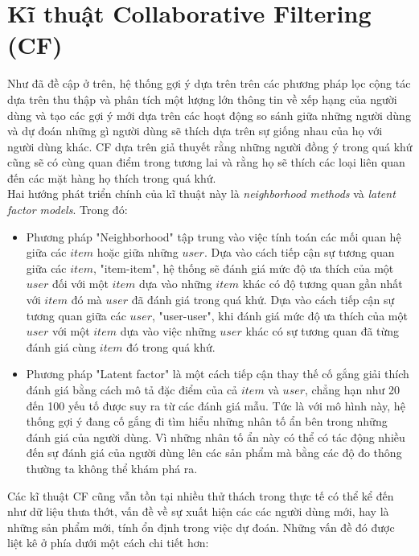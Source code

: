 \section{Kĩ thuật Collaborative Filtering (CF)}
Như đã đề cập ở trên, hệ thống gợi ý dựa trên trên các phương pháp lọc cộng tác dựa trên thu thập và phân tích một lượng lớn thông tin về xếp hạng của người dùng và tạo các gợi ý mới dựa trên các hoạt động so sánh giữa những người dùng và dự đoán những gì người dùng sẽ thích dựa trên sự giống nhau của họ với người dùng khác. CF dựa trên giả thuyết rằng những người đồng ý trong quá khứ cũng sẽ có cùng quan điểm trong tương lai và rằng họ sẽ thích các loại liên quan đến các mặt hàng họ thích trong quá khứ.\\
Hai hướng phát triển chính của kĩ thuật này là \textit{neighborhood methods} và \textit{latent factor models}. Trong đó:
\begin{itemize}
    \item Phương pháp "Neighborhood" tập trung vào việc tính toán các mối quan hệ giữa các $item$ hoặc giữa những $user$. Dựa vào cách tiếp cận sự tương quan giữa các $item$, "item-item", hệ thống sẽ đánh giá mức độ ưa thích của một $user$ đối với một $item$ dựa vào những $item$ khác có độ tương quan gần nhất với $item$ đó mà $user$ đã đánh giá trong quá khứ. Dựa vào cách tiếp cận sự tương quan giữa các $user$, "user-user", khi đánh giá mức độ ưa thích của một $user$ với một $item$ dựa vào việc những $user$ khác có sự tương quan đã từng đánh giá cùng $item$ đó trong quá khứ.
    \item Phương pháp "Latent factor" là một cách tiếp cận thay thế cố gắng giải thích đánh giá bằng cách mô tả đặc điểm của cả $item$ và $user$, chẳng hạn như 20 đến 100 yếu tố được suy ra từ các đánh giá mẫu. Tức là với mô hình này, hệ thống gợi ý đang cố gắng đi tìm hiểu những nhân tố ẩn bên trong những đánh giá của người dùng. Vì những nhân tố ẩn này có thể có tác động nhiều đến sự đánh giá của người dùng lên các sản phẩm mà bằng các độ đo thông thường ta không thể khám phá ra.
\end{itemize} 
Các kĩ thuật CF cũng vẫn tồn tại nhiều thử thách trong thực tế có thể kể đến như dữ liệu thưa thớt, vấn đề về sự xuất hiện các các người dùng mới, hay là những sản phẩm mới, tính ổn định trong việc dự đoán. Những vấn đề đó được liệt kê ở phía dưới một cách chi tiết hơn:
